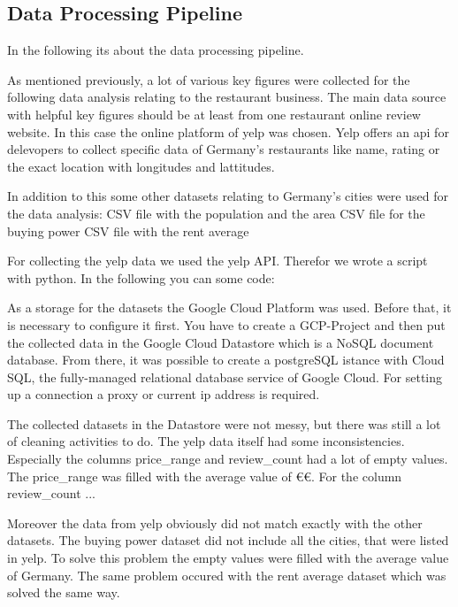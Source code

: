 \subsection{Data Processing Pipeline}
\label{subsec:pipeline}
In the following its about the data processing pipeline.

\label{subsec:Data sources}
As mentioned previously, a lot of various key figures were collected for the following data analysis relating to the restaurant business. The main data source with helpful key figures should be at least from one restaurant online review website. In this case the online platform of yelp was chosen. Yelp offers an api for delevopers to collect specific data of Germany's restaurants like name, rating or the exact location with longitudes and lattitudes.   

In addition to this some other datasets relating to Germany's cities were used for the data analysis:
CSV file with the population and the area
CSV file for the buying power 
CSV file with the rent average

\label{subsec:Data Ingestion}
For collecting the yelp data we used the yelp API. Therefor we wrote a script with python. In the following you can some code:

\label{subsec:Data Storage}
As a storage for the datasets the Google Cloud Platform was used. Before that, it is necessary to configure it first. You have to create a GCP-Project and then put the collected data in the Google Cloud Datastore which is a NoSQL document database. From there, it was possible to create a postgreSQL istance with Cloud SQL, the fully-managed relational database service of Google Cloud. For setting up a connection a proxy or current ip address is required.

\label{subsec:Data cleaning}
The collected datasets in the Datastore were not messy, but there was still a lot of cleaning activities to do. The yelp data itself had some inconsistencies. Especially the columns price\_range and review\_count had a lot of empty values. The price\_range was filled with the average value of \euro\euro. For the column review\_count ...%

Moreover the data from yelp obviously did not match exactly with the other datasets. The buying power dataset did not include all the cities, that were listed in yelp. To solve this problem the empty values were filled with the average value of Germany. The same problem occured with the rent average dataset which was solved the same way.

\label{subsec:Data analysis}
